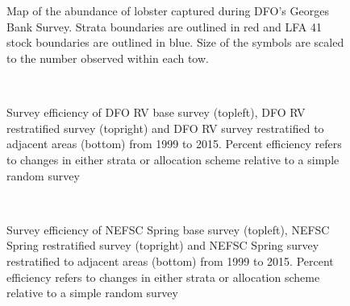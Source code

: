 \documentclass[11pt]{article}
\newcommand{\D}{.}
\newcommand{\e}{/backup/bio_data/bio.lobster/figures/} %
\begin{document}
        \begin{figure}
        \centering
        \\
        \\

         \caption{Map of the abundance of lobster captured during DFO's Georges Bank Survey. Strata boundaries are outlined in red and LFA 41 stock boundaries are outlined in blue. Size of the symbols are scaled to the number observed within each tow.}
        \end{figure}
        \clearpage




        \begin{figure}
        \centering
        \\
        \caption{Survey efficiency of DFO RV base survey (topleft), DFO RV restratified survey (topright) and DFO RV survey restratified to adjacent areas (bottom) from 1999 to 2015. Percent efficiency refers to changes in either strata or allocation scheme relative to a simple random survey }
        \end{figure}
        \clearpage



        \begin{figure}
        \centering
        \\
        \caption{Survey efficiency of NEFSC Spring base survey (topleft), NEFSC Spring restratified survey (topright) and NEFSC Spring survey restratified to adjacent areas (bottom) from 1999 to 2015. Percent efficiency refers to changes in either strata or allocation scheme relative to a simple random survey }
        \end{figure}
        \clearpage
\end{document}
